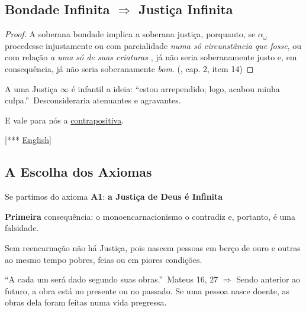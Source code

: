 \documentclass[12pt,a4paper]{article}
\begin{document}
		\subsection{Bondade Infinita $ \Rightarrow $ Justi\c{c}a Infinita}
			\begin{flushright}
			\end{flushright}

			\begin{proof}
				A soberana bondade implica a soberana justi\c{c}a, porquanto, se $ \alpha_\omega $ procedesse injustamente ou com parcialidade \emph{numa s\'o circunst\^ancia que fosse}, ou com rela\c{c}\~ao \emph{a uma s\'o de suas criaturas} \cite{criatura}, j\'a n\~ao seria soberanamente justo e, em consequ\^encia, j\'a n\~ao seria soberanamente \emph{bom}. (\cite{genese}, cap. 2, item 14)
			\end{proof}

			A uma Justi\c{c}a $ \infty $ \'e infantil a ideia: \textquotedblleft estou arrependido; logo, acabou minha culpa.\textquotedblright\, Desconsideraria atenuantes e agravantes.

			E vale para n\'os a \href{http://en.wikipedia.org/wiki/Contraposition}{contrapositiva}.

			[*** \href{http://sites.google.com/site/mathspirituality/}{English}]

		\subsection{A Escolha dos Axiomas}\label{escAxiomas}
			\begin{flushright}
			\end{flushright}

			Se partimos do axioma \textbf{A1}: \textbf{a Justi\c{c}a de Deus \'e Infinita}

			\textbf{Primeira} consequ\^encia: o monoencarnacionismo\cite{demomono} o contradiz e, portanto, \'e uma falsidade.

			\begin{flushright}
			\end{flushright}

			Sem reencarna\c{c}\~ao n\~ao h\'a Justi\c{c}a, pois nascem pessoas em ber\c{c}o de ouro e outras ao mesmo tempo\cite{tempo} pobres, feias ou em piores condi\c{c}\~oes.

			\textquotedblleft A cada um ser\'a dado segundo suas obras.\textquotedblright\, Mateus 16, 27 \cite{obras} $ \Rightarrow $ Sendo anterior ao futuro, a obra est\'a no presente ou no passado. Se uma pessoa nasce doente, as obras dela foram feitas numa vida pregressa.
\end{document}
